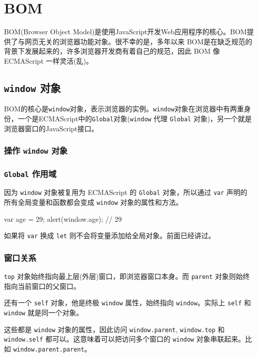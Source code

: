 \section{BOM}

BOM(Browser Object Model)是使用JavaScript开发Web应用程序的核心。BOM提供了与网页无关的浏览器功能对象。很不幸的是，多年以来 BOM是在缺乏规范的背景下发展起来的，许多浏览器开发商有着自己的规范，因此 BOM 像 ECMAScript 一样灵活(乱)。

\subsection{\texttt{window} 对象}

BOM的核心是\texttt{window}对象，表示浏览器的实例。\texttt{window}对象在浏览器中有两重身份，一个是ECMAScript中的\texttt{Global}对象(\texttt{window} 代理 \texttt{Global} 对象)，另一个就是浏览器窗口的JavaScript接口。

\subsubsection{操作 \texttt{window} 对象}

\subsubsection*{\texttt{Global} 作用域}

因为 \texttt{window} 对象被复用为 ECMAScript 的 \texttt{Global} 对象，所以通过 \texttt{var} 声明的所有全局变量和函数都会变成 \texttt{window} 对象的属性和方法。

\begin{JavaScript}
var age = 29;
alert(window.age); // 29
\end{JavaScript}

如果将 \texttt{var} 换成 \texttt{let} 则不会将变量添加给全局对象。前面已经讲过。

\subsubsection*{窗口关系}

\texttt{top} 对象始终指向最上层(外层)窗口，即浏览器窗口本身。而 \texttt{parent} 对象则始终指向当前窗口的父窗口。

还有一个 \texttt{self} 对象，他是终极 \texttt{window} 属性，始终指向 \texttt{window}。实际上 \texttt{self} 和 \texttt{window} 就是同一个对象。

这些都是 \texttt{window} 对象的属性，因此访问 \texttt{window.parent}, \texttt{window.top} 和 \texttt{window.self} 都可以。这意味着可以把访问多个窗口的 \texttt{window} 对象串联起来。比如 \texttt{window.parent.parent}。

